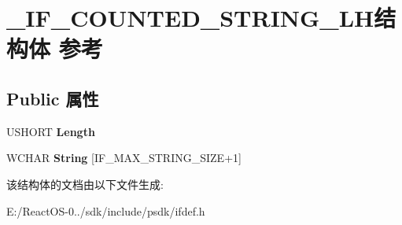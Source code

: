 \hypertarget{struct___i_f___c_o_u_n_t_e_d___s_t_r_i_n_g___l_h}{}\section{\+\_\+\+I\+F\+\_\+\+C\+O\+U\+N\+T\+E\+D\+\_\+\+S\+T\+R\+I\+N\+G\+\_\+\+L\+H结构体 参考}
\label{struct___i_f___c_o_u_n_t_e_d___s_t_r_i_n_g___l_h}
\subsection*{Public 属性}
\begin{DoxyCompactItemize}
\item 
\mbox{\label{struct___i_f___c_o_u_n_t_e_d___s_t_r_i_n_g___l_h_aab32ab9aba94232b0c6c30cfb1015d59}} 
U\+S\+H\+O\+RT {\bfseries Length}
\item 
\mbox{\label{struct___i_f___c_o_u_n_t_e_d___s_t_r_i_n_g___l_h_a8752190ff7febe74c6372462535e61c7}} 
W\+C\+H\+AR {\bfseries String} \mbox{[}I\+F\+\_\+\+M\+A\+X\+\_\+\+S\+T\+R\+I\+N\+G\+\_\+\+S\+I\+ZE+1\mbox{]}
\end{DoxyCompactItemize}


该结构体的文档由以下文件生成\+:\begin{DoxyCompactItemize}
\item 
E\+:/\+React\+O\+S-\/0../sdk/include/psdk/ifdef.\+h\end{DoxyCompactItemize}
